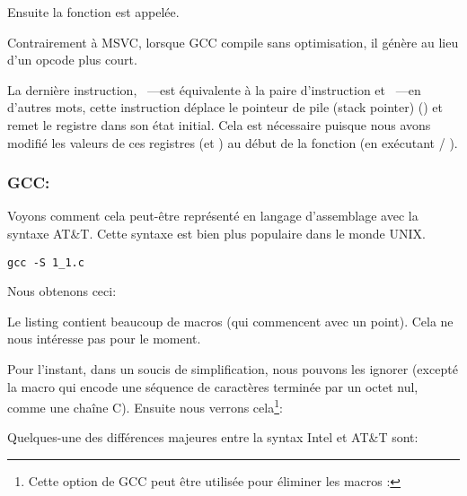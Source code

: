 Ensuite la fonction \printf est appelée.

Contrairement à MSVC, lorsque GCC compile sans optimisation, il génère  au lieu d'un opcode plus court.

La dernière instruction, \LEAVE~---est équivalente à la paire d'instruction  et ~---en d'autres mots,
cette instruction déplace le pointeur de pile (\gls{stack pointer}) (\ESP) et remet le registre \EBP dans son état initial.
Cela est nécessaire puisque nous avons modifié les valeurs de ces registres (\ESP et \EBP) au début de la fonction (en exécutant  / ).

\subsubsection{GCC: \ATTSyntax}
\label{ATT_syntax}

Voyons comment cela peut-être représenté en langage d'assemblage avec la syntaxe AT\&T.
Cette syntaxe est bien plus populaire dans le monde UNIX.

\begin{lstlisting}[caption=compilons avec GCC 4.7.3]
gcc -S 1_1.c
\end{lstlisting}

Nous obtenons ceci:



Le listing contient beaucoup de macros (qui commencent avec un point). Cela ne nous intéresse pas pour le moment.

Pour l'instant, dans un soucis de simplification, nous pouvons les ignorer (excepté la macro 
qui encode une séquence de caractères terminée par un octet nul, comme une chaîne C).
Ensuite nous verrons cela\footnote{Cette option de GCC peut être utilisée pour éliminer les macros :
}:



\myindex{\ATTSyntax}
\myindex{\IntelSyntax}
Quelques-une des différences majeures entre la syntax Intel et AT\&T sont:

